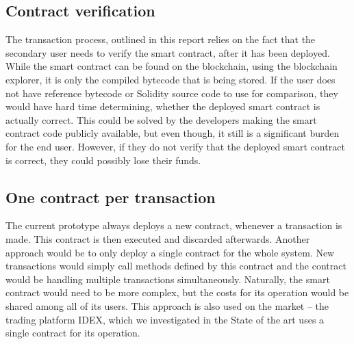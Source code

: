 \subsection{Contract verification}
The transaction process, outlined in this report relies on the fact that the secondary user needs to verify the smart contract, after it has been deployed. While the smart contract can be found on the blockchain, using the blockchain explorer, it is only the compiled bytecode that is being stored. If the user does not have reference bytecode or Solidity source code to use for comparison, they would have hard time determining, whether the deployed smart contract is actually correct. This could be solved by the developers making the smart contract code publicly available, but even though, it still is a significant burden for the end user. However, if they do not verify that the deployed smart contract is correct, they could possibly lose their funds.

\subsection{One contract per transaction}
The current prototype always deploys a new contract, whenever a transaction is made. This contract is then executed and discarded afterwards. Another approach would be to only deploy a single contract for the whole system. New transactions would simply call methods defined by this contract and the contract would be handling multiple transactions simultaneously. Naturally, the smart contract would need to be more complex, but the costs for its operation would be shared among all of its users. This approach is also used on the market -- the trading platform IDEX, which we investigated in the State of the art uses a single contract for its operation.
